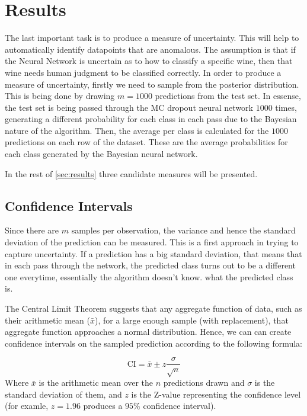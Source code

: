 \documentclass[11pt,twoside]{article}
\numberwithin{Theorem}{section}
\numberwithin{Definition}{section}
\numberwithin{Lemma}{section}
\numberwithin{Algorithm}{section}
\numberwithin{equation}{section}
\begin{document}
\section{Results}
\label{sec:results}

The last important task is to produce a measure of uncertainty. This will help to automatically identify datapoints that are anomalous. The assumption is that if the Neural Network is uncertain as to how to classify a specific wine, then that wine needs human judgment to be classified correctly.
In order to produce a measure of uncertainty, firstly we need to sample from the posterior distribution. This is being done by drawing $m=1000$ predictions from the test set. In essense, the test set is being passed through the MC dropout neural network $1000$ times, generating a different probability for each class in each pass due to the Bayesian nature of the algorithm. Then, the average per class is calculated for the $1000$ predictions on each row of the dataset. These are the average probabilities for each class generated by the Bayesian neural network. 

In the rest of \autoref{sec:results} three candidate measures will be presented.

\subsection{Confidence Intervals}

Since there are $m$ samples per observation, the variance and hence the standard deviation of the prediction can be measured. This is a first approach in trying to capture uncertainty. If a prediction has a big standard deviation, that means that in each pass through the network, the predicted class turns out to be a different one everytime, essentially the algorithm doesn't know. what the predicted class is. 

The Central Limit Theorem suggests that any aggregate function of data, such as their arithmetic mean ($\bar{x}$), for a large enough sample (with replacement), that aggregate function approaches a normal distribution. Hence, we can can create confidence intervals on the sampled prediction according to the following formula:

\begin{equation}
\text{CI} = \bar{x} \pm z \frac{\sigma}{\sqrt{n}}
\end{equation}
Where $\bar{x}$ is the arithmetic mean over the $n$ predictions drawn and $\sigma$ is the standard deviation of them, and $z$ is the Z-value representing the confidence level (for examle, $z=1.96$ produces a $95\%$ confidence interval).
\end{document}
